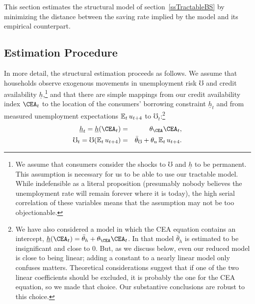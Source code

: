 \documentclass[titlepage]{\econtex}
\begin{document}
This section estimates the structural model of section~\ref{ssTractableBS} by minimizing the distance between the saving rate implied by the model and its empirical counterpart. %

\hypertarget{Estimation-Procedure}{}
\subsection{Estimation Procedure}

In more detail, the structural estimation proceeds as follows. We assume that households observe exogenous movements in unemployment risk $\mho$ and credit availability $\underline{h}$,\footnote{We assume that consumers consider the shocks to $\mho$ and $\underline{h}$ to be permanent.  This assumption is necessary for us to be able to use our tractable model.  While indefensible as a literal proposition (presumably nobody believes the unemployment rate will remain forever where it is today), the high serial correlation of these variables means that the assumption may not be too objectionable.} and that there are simple mappings from our credit availability index $\CEA_{t}$ to the location of the consumers' borrowing constraint $\underline{h}_{t}$ and from measured unemployment expectations $\operatorname{\mathbb{E}}_{t}u_{t+4}$ to $\mho_{t}$:\footnote{We have also considered a model in which the CEA equation contains an intercept, $\underline{h}(\CEA_{t}) = \bar{\theta}_h+\theta_\CEA \CEA_{t}$. In that model $\bar{\theta}_h$ is estimated to be insignificant and close to 0.  But, as we discuss below, even our reduced model is close to being linear; adding a constant to a nearly linear model only confuses matters.  Theoretical considerations suggest that if one of the two linear coefficients should be excluded, it is probably the one for the CEA equation, so we made that choice.  Our substantive conclusions are robust to this choice. }
\begin{eqnarray}
 \underline{h}_{t} = \underline{h}(\CEA_{t}) & = & \theta_\CEA \CEA_{t}, \nonumber \\
\mho_{t}= \mho(\Ex_{t}u_{t+4}) & = & \bar{\theta}_\mho+\theta_u \Ex_{t}u_{t+4}. \label{unempEq}
\end{eqnarray}
\end{document}
